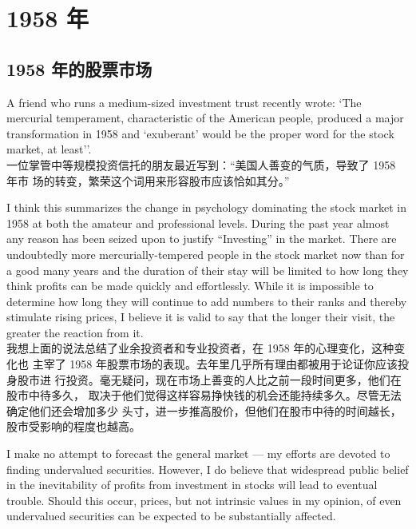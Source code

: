 \chapter{1958 年}

\section{1958 年的股票市场}

\begin{verseparallel}
  {
    \noindent A friend who runs a medium-sized investment trust recently wrote:
    `The mercurial temperament, characteristic of the American people, produced
    a major transformation in 1958 and `exuberant' would be the proper word
    for the stock market, at least''. \\
  }
  {
    一位掌管中等规模投资信托的朋友最近写到：“美国人善变的气质，导致了 1958 年市
    场的转变，繁荣这个词用来形容股市应该恰如其分。”
  }
\end{verseparallel}

\begin{verseparallel}
  {
    I think this summarizes the change in psychology dominating the stock market
    in 1958 at both the amateur and professional levels. During the past year
    almost any reason has been seized upon to justify “Investing” in the
    market. There are undoubtedly more mercurially-tempered people in the stock
    market now than for a good many years and the duration of their stay will be
    limited to how long they think profits can be made quickly and effortlessly.
    While it is impossible to determine how long they will continue to add
    numbers to their ranks and thereby stimulate rising prices, I believe it is
    valid to say that the longer their visit, the greater the reaction from it. \\
  }
  {
    我想上面的说法总结了业余投资者和专业投资者，在 1958 年的心理变化，这种变化也
    主宰了 1958 年股票市场的表现。去年里几乎所有理由都被用于论证你应该投身股市进
    行投资。毫无疑问，现在市场上善变的人比之前一段时间更多，他们在股市中待多久，
    取决于他们觉得这样容易挣快钱的机会还能持续多久。尽管无法确定他们还会增加多少
    头寸，进一步推高股价，但他们在股市中待的时间越长，股市受影响的程度也越高。
  }
\end{verseparallel}

\begin{verseparallel}
  {
    I make no attempt to forecast the general market --- my efforts are devoted
    to finding undervalued securities. However, I do believe that widespread
    public belief in the inevitability of profits from investment in stocks will
    lead to eventual trouble. Should this occur, prices, but not intrinsic
    values in my opinion, of even undervalued securities can be expected to be
    substantially affected. \\
  }
  {
  }
\end{verseparallel}

